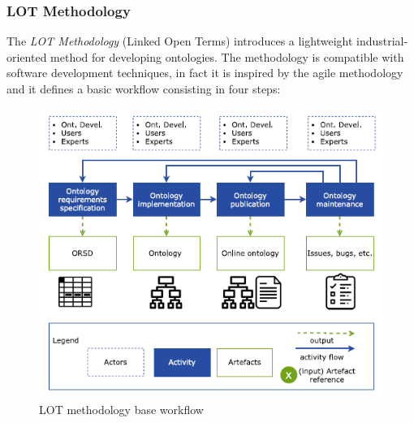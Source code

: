 \subsubsection{LOT Methodology}
The \textit{LOT Methodology} (Linked Open Terms) \cite{poveda2022lot} introduces a lightweight industrial-oriented method for developing ontologies. The methodology is compatible with software development techniques, in fact it is inspired by the agile methodology and it defines a basic workflow consisting in four steps:
\begin{figure}[H]
    \centering
    \includegraphics[width=0.5\linewidth]{Figures/fig_3.png}
    \caption{LOT methodology base workflow}
    \label{fig:enter-label}
\end{figure}


